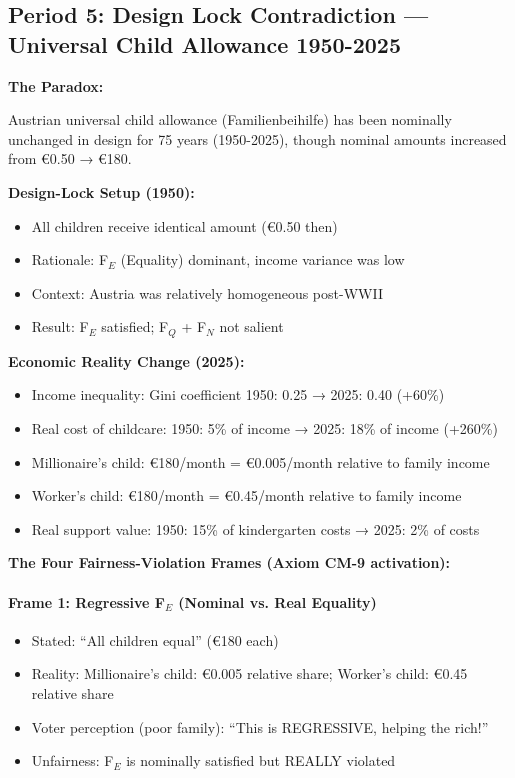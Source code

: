 \subsection{Period 5: Design Lock Contradiction --- Universal Child Allowance 1950-2025}

\textbf{The Paradox:}

Austrian universal child allowance (Familienbeihilfe) has been nominally unchanged in design
for 75 years (1950-2025), though nominal amounts increased from €0.50 → €180.

\textbf{Design-Lock Setup (1950):}
\begin{itemize}[nosep]
\item All children receive identical amount (€0.50 then)
\item Rationale: F$_E$ (Equality) dominant, income variance was low
\item Context: Austria was relatively homogeneous post-WWII
\item Result: F$_E$ satisfied; F$_Q$ + F$_N$ not salient
\end{itemize}

\textbf{Economic Reality Change (2025):}
\begin{itemize}[nosep]
\item Income inequality: Gini coefficient 1950: 0.25 → 2025: 0.40 (+60\%)
\item Real cost of childcare: 1950: 5\% of income → 2025: 18\% of income (+260\%)
\item Millionaire's child: €180/month = €0.005/month relative to family income
\item Worker's child: €180/month = €0.45/month relative to family income
\item Real support value: 1950: 15\% of kindergarten costs → 2025: 2\% of costs
\end{itemize}

\textbf{The Four Fairness-Violation Frames (Axiom CM-9 activation):}

\paragraph{Frame 1: Regressive F$_E$ (Nominal vs. Real Equality)}
\begin{itemize}[nosep]
\item Stated: ``All children equal'' (€180 each)
\item Reality: Millionaire's child: €0.005 relative share; Worker's child: €0.45 relative share
\item Voter perception (poor family): ``This is REGRESSIVE, helping the rich!''
\item Unfairness: F$_E$ is nominally satisfied but REALLY violated
\end{itemize}

